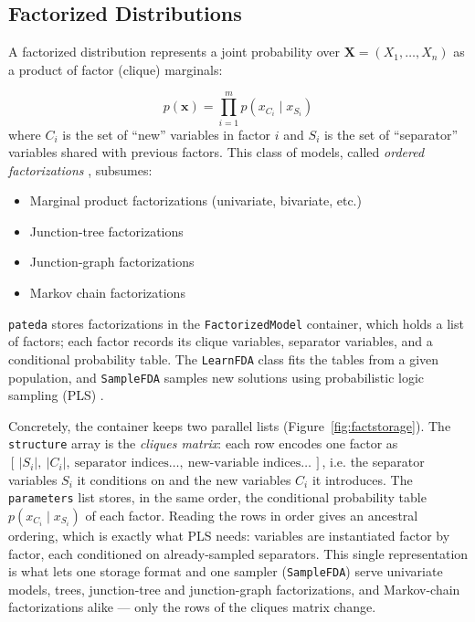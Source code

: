 \documentclass[a4paper,11pt]{article}
\begin{document}
\subsection{Factorized Distributions}
\label{sec:factorized}

A factorized distribution \citep{Muhlenbein_et_al:1999,Harik:1999} represents a joint probability over $\mathbf{X} = (X_1, \ldots, X_n)$ as a product of factor (clique) marginals:

\begin{equation}
  p(\mathbf{x}) = \prod_{i=1}^{m} p(x_{C_i} \mid x_{S_i})
\end{equation}
where $C_i$ is the set of ``new'' variables in factor $i$ and $S_i$ is the set of ``separator'' variables shared with previous factors.  This class of models, called \emph{ordered factorizations} \citep{Santana:2005}, subsumes:
\begin{itemize}
  \item Marginal product factorizations (univariate, bivariate, etc.)  \citep{Muhlenbein_and_Paas:1996, Harik:1999} 
  \item Junction-tree factorizations \citep{Muhlenbein_et_al:1999,Ochoa_et_al:1999}
  \item Junction-graph factorizations \citep{Santana:2005}
   \item Markov chain factorizations \citep{Santana_et_al:2008a}
\end{itemize}

\texttt{pateda} stores factorizations in the \texttt{FactorizedModel} container, which holds a list of factors; each factor records its clique variables, separator variables, and a conditional probability table.  The \texttt{LearnFDA} class fits the tables from a given population, and \texttt{SampleFDA} samples new solutions using probabilistic logic sampling (PLS) \citep{Muhlenbein_and_Paas:1996}.

Concretely, the container keeps two parallel lists (Figure~\ref{fig:factstorage}). The \texttt{structure} array is the \emph{cliques matrix}: each row encodes one factor as $[\,|S_i|,\ |C_i|,\ \text{separator indices}\ldots,\ \text{new-variable indices}\ldots\,]$, i.e. the separator variables $S_i$ it conditions on and the new variables $C_i$ it introduces. The \texttt{parameters} list stores, in the same order, the conditional probability table $p(x_{C_i}\mid x_{S_i})$ of each factor. Reading the rows in order gives an ancestral ordering, which is exactly what PLS needs: variables are instantiated factor by factor, each conditioned on already-sampled separators. This single representation is what lets one storage format and one sampler (\texttt{SampleFDA}) serve univariate models, trees, junction-tree and junction-graph factorizations, and Markov-chain factorizations alike --- only the rows of the cliques matrix change.
\end{document}
